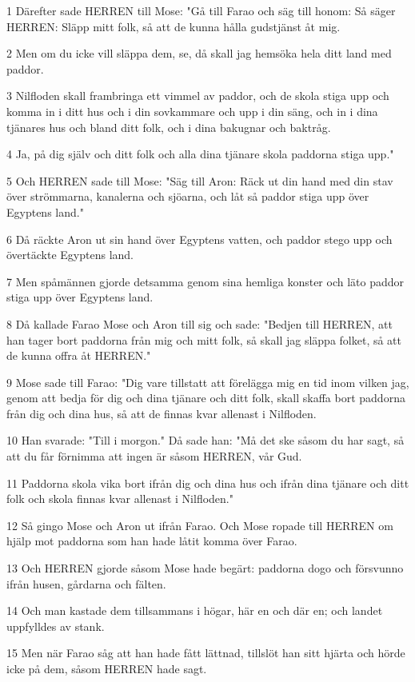 \par 1 Därefter sade HERREN till Mose: "Gå till Farao och säg till honom: Så säger HERREN: Släpp mitt folk, så att de kunna hålla gudstjänst åt mig.
\par 2 Men om du icke vill släppa dem, se, då skall jag hemsöka hela ditt land med paddor.
\par 3 Nilfloden skall frambringa ett vimmel av paddor, och de skola stiga upp och komma in i ditt hus och i din sovkammare och upp i din säng, och in i dina tjänares hus och bland ditt folk, och i dina bakugnar och baktråg.
\par 4 Ja, på dig själv och ditt folk och alla dina tjänare skola paddorna stiga upp."
\par 5 Och HERREN sade till Mose: "Säg till Aron: Räck ut din hand med din stav över strömmarna, kanalerna och sjöarna, och låt så paddor stiga upp över Egyptens land."
\par 6 Då räckte Aron ut sin hand över Egyptens vatten, och paddor stego upp och övertäckte Egyptens land.
\par 7 Men spåmännen gjorde detsamma genom sina hemliga konster och läto paddor stiga upp över Egyptens land.
\par 8 Då kallade Farao Mose och Aron till sig och sade: "Bedjen till HERREN, att han tager bort paddorna från mig och mitt folk, så skall jag släppa folket, så att de kunna offra åt HERREN."
\par 9 Mose sade till Farao: "Dig vare tillstatt att förelägga mig en tid inom vilken jag, genom att bedja för dig och dina tjänare och ditt folk, skall skaffa bort paddorna från dig och dina hus, så att de finnas kvar allenast i Nilfloden.
\par 10 Han svarade: "Till i morgon." Då sade han: "Må det ske såsom du har sagt, så att du får förnimma att ingen är såsom HERREN, vår Gud.
\par 11 Paddorna skola vika bort ifrån dig och dina hus och ifrån dina tjänare och ditt folk och skola finnas kvar allenast i Nilfloden."
\par 12 Så gingo Mose och Aron ut ifrån Farao. Och Mose ropade till HERREN om hjälp mot paddorna som han hade låtit komma över Farao.
\par 13 Och HERREN gjorde såsom Mose hade begärt: paddorna dogo och försvunno ifrån husen, gårdarna och fälten.
\par 14 Och man kastade dem tillsammans i högar, här en och där en; och landet uppfylldes av stank.
\par 15 Men när Farao såg att han hade fått lättnad, tillslöt han sitt hjärta och hörde icke på dem, såsom HERREN hade sagt.
